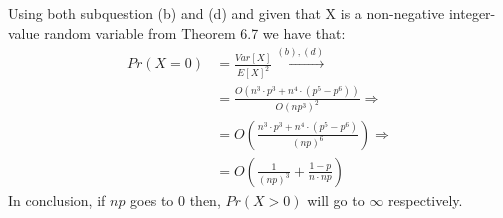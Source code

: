 \documentclass[11pt]{537homework}
\begin{document}
\subsection{}
Using both subquestion (b) and (d) and given that X is a non-negative integer-value random variable from Theorem 6.7 we have that:
\begin{align*}
Pr(X = 0) &= \frac{Var[X]}{E[X]^2} \xrightarrow{(b),(d)} \\
          &= \frac{O(n^3 \cdot p^3 + n^4 \cdot (p^5 - p^6))}{O(np^3)^2} \Longrightarrow \\
          &= O(\frac{n^3 \cdot p^3 + n^4 \cdot (p^5 - p^6)}{(np)^6}) \Longrightarrow \\
          &= O(\frac{1}{(np)^3} + \frac{1 - p}{n \cdot np })
\end{align*}
In conclusion, if $np$ goes to 0 then, $Pr(X>0)$ will go to $\infty$ respectively.
\end{document}
